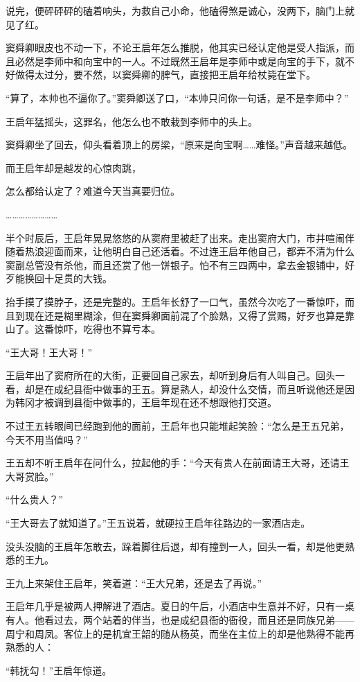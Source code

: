 说完，便砰砰砰的磕着响头，为救自己小命，他磕得煞是诚心，没两下，脑门上就见了红。

窦舜卿眼皮也不动一下，不论王启年怎么推脱，他其实已经认定他是受人指派，而且必然是李师中和向宝中的一人。不过既然王启年是李师中或是向宝的手下，就不好做得太过分，要不然，以窦舜卿的脾气，直接把王启年给杖毙在堂下。

“算了，本帅也不逼你了。”窦舜卿送了口，“本帅只问你一句话，是不是李师中？”

王启年猛摇头，这罪名，他怎么也不敢栽到李师中的头上。

窦舜卿坐了回去，仰头看着顶上的房梁，“原来是向宝啊……难怪。”声音越来越低。

而王启年却是越发的心惊肉跳，

怎么都给认定了？难道今天当真要归位。

……………………

半个时辰后，王启年晃晃悠悠的从窦府里被赶了出来。走出窦府大门，市井喧闹伴随着热浪迎面而来，让他明白自己还活着。不过连王启年他自己，都弄不清为什么窦副总管没有杀他，而且还赏了他一饼银子。怕不有三四两中，拿去金银铺中，好歹能换回十足贯的大钱。

抬手摸了摸脖子，还是完整的。王启年长舒了一口气，虽然今次吃了一番惊吓，而且到现在还是糊里糊涂，但在窦舜卿面前混了个脸熟，又得了赏赐，好歹也算是靠山了。这番惊吓，吃得也不算亏本。

“王大哥！王大哥！”

王启年出了窦府所在的大街，正要回自己家去，却听到身后有人叫自己。回头一看，却是在成纪县衙中做事的王五。算是熟人，却没什么交情，而且听说他还是因为韩冈才被调到县衙中做事的，王启年现在还不想跟他打交道。

不过王五转眼间已经跑到他的面前，王启年也只能堆起笑脸：“怎么是王五兄弟，今天不用当值吗？”

王五却不听王启年在问什么，拉起他的手：“今天有贵人在前面请王大哥，还请王大哥赏脸。”

“什么贵人？”

“王大哥去了就知道了。”王五说着，就硬拉王启年往路边的一家酒店走。

没头没脑的王启年怎敢去，跺着脚往后退，却有撞到一人，回头一看，却是他更熟悉的王九。

王九上来架住王启年，笑着道：“王大兄弟，还是去了再说。”

王启年几乎是被两人押解进了酒店。夏日的午后，小酒店中生意并不好，只有一桌有人。他看过去，两个站着的伴当，也是成纪县衙的衙役，而且还是同族兄弟——周宁和周凤。客位上的是机宜王韶的随从杨英，而坐在主位上的却是他熟得不能再熟悉的人：

“韩抚勾！”王启年惊道。

